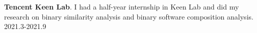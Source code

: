 
\textbf{Tencent Keen Lab}. I had a half-year internship in Keen Lab and did my research on binary similarity analysis and binary software composition analysis. \hfill 2021.3-2021.9

